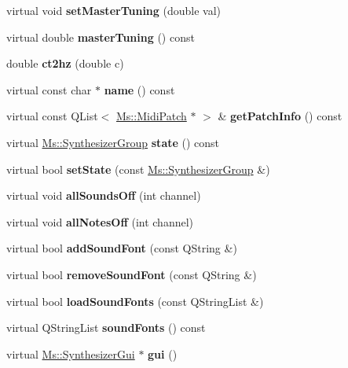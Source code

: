 \begin{DoxyCompactItemize}
virtual void {\bfseries set\+Master\+Tuning} (double val)
\item 
\mbox{\label{class_zerberus_a44fa6e5785c56a53c0bfa077b726019a}} 
virtual double {\bfseries master\+Tuning} () const
\item 
\mbox{\label{class_zerberus_a2fcf53be263608e9994dd2bff5438473}} 
double {\bfseries ct2hz} (double c)
\item 
\mbox{\label{class_zerberus_a47f2f28ff97ed0891e9f0fd81a88c078}} 
virtual const char $\ast$ {\bfseries name} () const
\item 
\mbox{\label{class_zerberus_a6c71bb28b5d75b0bc05fd7b69e3548e2}} 
virtual const Q\+List$<$ \hyperlink{struct_ms_1_1_midi_patch}{Ms\+::\+Midi\+Patch} $\ast$ $>$ \& {\bfseries get\+Patch\+Info} () const
\item 
\mbox{\label{class_zerberus_adea20999384b6f96d00fdeac83fb9344}} 
virtual \hyperlink{class_ms_1_1_synthesizer_group}{Ms\+::\+Synthesizer\+Group} {\bfseries state} () const
\item 
\mbox{\label{class_zerberus_ace42f46cecdb446afb4a52451ba4f89c}} 
virtual bool {\bfseries set\+State} (const \hyperlink{class_ms_1_1_synthesizer_group}{Ms\+::\+Synthesizer\+Group} \&)
\item 
\mbox{\label{class_zerberus_a619357286c83b29e70d16a4cfb1f60ce}} 
virtual void {\bfseries all\+Sounds\+Off} (int channel)
\item 
\mbox{\label{class_zerberus_a7464812d40bd8a4a2d85971b548e9cac}} 
virtual void {\bfseries all\+Notes\+Off} (int channel)
\item 
\mbox{\label{class_zerberus_a3729ee1029ef7182f4cb68c7c99349f2}} 
virtual bool {\bfseries add\+Sound\+Font} (const Q\+String \&)
\item 
\mbox{\label{class_zerberus_a308d61496ec3754b907fcbfcd4e91af8}} 
virtual bool {\bfseries remove\+Sound\+Font} (const Q\+String \&)
\item 
\mbox{\label{class_zerberus_af5bfecde358c90505e042de4cd4a8a8b}} 
virtual bool {\bfseries load\+Sound\+Fonts} (const Q\+String\+List \&)
\item 
\mbox{\label{class_zerberus_a6217ed9472d75e89d25e2944e8f0e398}} 
virtual Q\+String\+List {\bfseries sound\+Fonts} () const
\item 
\mbox{\label{class_zerberus_afaabec09a0b2e393e4c88d08dca0cdca}} 
virtual \hyperlink{class_ms_1_1_synthesizer_gui}{Ms\+::\+Synthesizer\+Gui} $\ast$ {\bfseries gui} ()
\end{DoxyCompactItemize}
